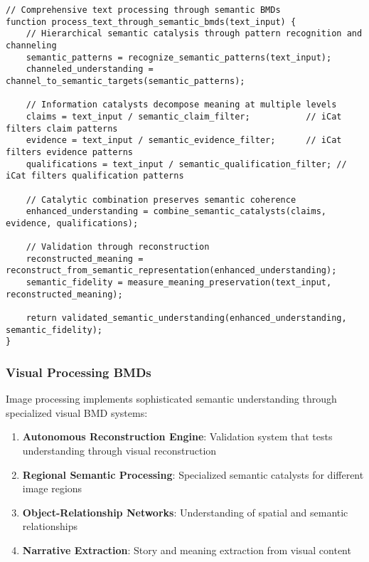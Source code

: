 \documentclass[12pt,a4paper,twoside]{article}
\begin{document}
\begin{lstlisting}[caption=Theoretical Text BMD Processing]
// Comprehensive text processing through semantic BMDs
function process_text_through_semantic_bmds(text_input) {
    // Hierarchical semantic catalysis through pattern recognition and channeling
    semantic_patterns = recognize_semantic_patterns(text_input);
    channeled_understanding = channel_to_semantic_targets(semantic_patterns);

    // Information catalysts decompose meaning at multiple levels
    claims = text_input / semantic_claim_filter;           // iCat filters claim patterns
    evidence = text_input / semantic_evidence_filter;      // iCat filters evidence patterns
    qualifications = text_input / semantic_qualification_filter; // iCat filters qualification patterns

    // Catalytic combination preserves semantic coherence
    enhanced_understanding = combine_semantic_catalysts(claims, evidence, qualifications);

    // Validation through reconstruction
    reconstructed_meaning = reconstruct_from_semantic_representation(enhanced_understanding);
    semantic_fidelity = measure_meaning_preservation(text_input, reconstructed_meaning);

    return validated_semantic_understanding(enhanced_understanding, semantic_fidelity);
}
\end{lstlisting}

\subsubsection{Visual Processing BMDs}

Image processing implements sophisticated semantic understanding through specialized visual BMD systems:

\begin{enumerate}
\item \textbf{Autonomous Reconstruction Engine}: Validation system that tests understanding through visual reconstruction
\item \textbf{Regional Semantic Processing}: Specialized semantic catalysts for different image regions
\item \textbf{Object-Relationship Networks}: Understanding of spatial and semantic relationships
\item \textbf{Narrative Extraction}: Story and meaning extraction from visual content
\end{enumerate}
\end{document}
